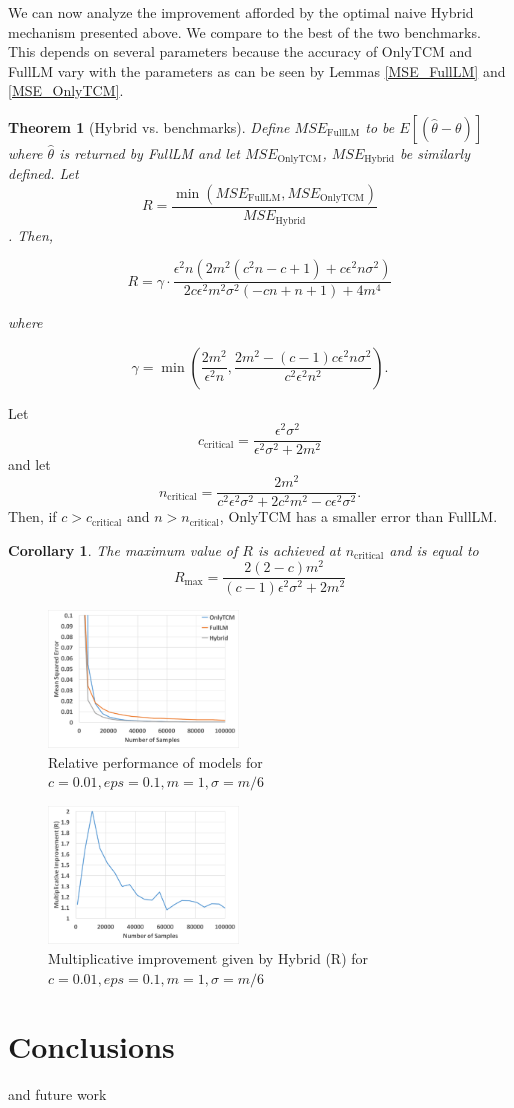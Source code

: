 \documentclass{article}
\theoremstyle{plain}
\newtheorem{thm}{Theorem}[section]
\newtheorem*{cor}{Corollary}
\begin{document}
We can now analyze the improvement afforded by the optimal naive Hybrid mechanism presented above. We compare to the best of the two benchmarks. This depends on several parameters because the accuracy of OnlyTCM and FullLM vary with the parameters as can be seen by Lemmas \ref{MSE_FullLM} and \ref{MSE_OnlyTCM}. 

\begin{thm}[Hybrid vs. benchmarks]
Define $MSE_{\text{FullLM}}$ to be $E[(\hat{\theta} - \theta)]$ where $\hat{\theta}$ is returned by FullLM and let $MSE_{\text{OnlyTCM}}$, $MSE_{\text{Hybrid}}$ be similarly defined.
Let 
$$R = \frac{\min(MSE_{\text{FullLM}}, MSE_{\text{OnlyTCM}})}{MSE_{\text{Hybrid}}}$$.
Then, 

$$R = \gamma \cdot \frac{\epsilon^2 n \left(2 m^2 \left(c^2 n-c+1\right)+c \epsilon^2 n \sigma^2\right)}{2 c \epsilon^2 m^2 \sigma^2 (-c n+n+1)+4 m^4}$$

where 

$$\gamma = \min \left(\frac{2 m^2}{\epsilon^2 n},\frac{2 m^2-(c-1) c \epsilon^2 n \sigma^2}{c^2 \epsilon^2 n^2}\right).$$
\end{thm}

Let $$c_{\text{critical}} = \frac{\epsilon^2 \sigma^2}{\epsilon^2 \sigma^2+2 m^2}$$ and let $$n_{\text{critical}} = \frac{2 m^2}{c^2 \epsilon^2 \sigma^2+2 c^2 m^2-c \epsilon^2 \sigma^2}.$$ Then, if $c>c_{\text{critical}}$ and $n > n_{\text{critical}}$, OnlyTCM has a smaller error than FullLM.

\begin{cor}
The maximum value of $R$ is achieved at $n_{\text{critical}}$ and is equal to $$R_{\text{max}} = \frac{2 (2-c) m^2}{(c-1) \epsilon^2 \sigma^2+2 m^2}$$
\end{cor}

\begin{figure}[h]
\includegraphics[width=0.45\textwidth]{eps01c01.pdf}
\caption{Relative performance of models for $c=0.01, eps=0.1, m=1, \sigma = m/6$}
\end{figure}

\begin{figure}[h]
\includegraphics[width=0.45\textwidth]{imp_eps01c01.pdf}
\caption{Multiplicative improvement given by Hybrid (R) for $c=0.01, eps=0.1, m=1, \sigma = m/6$}
\end{figure}


\section{Conclusions}
and future work

\small


\end{document}
